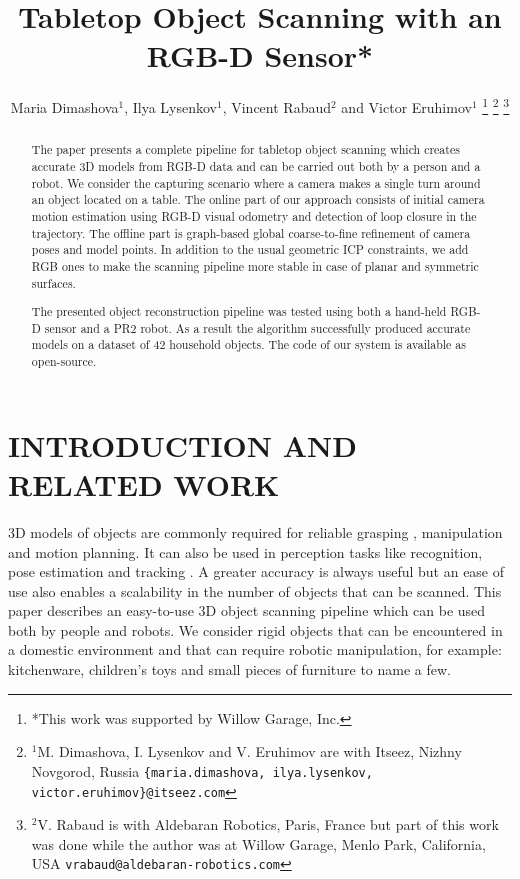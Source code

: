\documentclass[letterpaper, 10 pt, conference]{ieeeconf}  %
\title{\LARGE \bf
Tabletop Object Scanning with an RGB-D Sensor*
}
\author{Maria Dimashova$^{1}$, Ilya Lysenkov$^{1}$, Vincent Rabaud$^{2}$ and Victor Eruhimov$^{1}$
\thanks{*This work was supported by Willow Garage, Inc.}%
\thanks{$^{1}$M. Dimashova, I. Lysenkov and V. Eruhimov are with Itseez, Nizhny Novgorod, Russia
        {\tt\small \{maria.dimashova, ilya.lysenkov, victor.eruhimov\}@itseez.com}}%
\thanks{$^{2}$V. Rabaud is with Aldebaran Robotics, Paris, France but part of this work was done while the author was 
at Willow Garage, Menlo Park, California, USA {\tt\small vrabaud@aldebaran-robotics.com}}%
}
\begin{document}
\maketitle
\thispagestyle{empty}
\pagestyle{empty}


\begin{abstract}
The paper presents a complete pipeline for tabletop object scanning
which creates accurate 3D models from RGB-D data and can be carried out both by a person
and a robot. We consider the capturing scenario where a camera makes
a single turn around an object located on a table. The online part of our approach consists 
of initial camera motion estimation using RGB-D visual
odometry and detection of loop closure in the trajectory. The offline part
is graph-based global coarse-to-fine refinement of camera poses and model points.
In addition to the usual geometric ICP constraints, we add
RGB ones to make the scanning pipeline more stable in case 
of planar and symmetric surfaces. 

The presented object reconstruction pipeline was tested using both a hand-held RGB-D sensor and a PR2 robot.
As a result the algorithm successfully produced accurate models on a dataset of 42 household objects.
The code of our system is available as open-source.

\end{abstract}


\section{INTRODUCTION AND RELATED WORK}

3D models of objects are commonly required for reliable grasping \cite{miller2004graspit, sahbani2012overview},
manipulation and motion planning. It can also be used in perception tasks like recognition, pose estimation and tracking \cite{klank2009real, hinterstoisser2012accv}.
A greater accuracy is always useful but an ease of use also enables a scalability
in the number of objects that can be scanned.
This paper describes an easy-to-use 3D object scanning pipeline
which can be used both by people and robots.
We consider rigid objects that can be encountered
in a domestic environment and that can require robotic manipulation, for example:
kitchenware, children's toys and small pieces of furniture to name a few.
\end{document}
